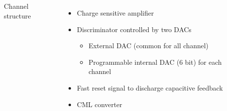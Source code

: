 \documentclass[aspectratio=169]{beamer}
\begin{document}
\begin{frame}
\begin{columns}
\begin{columns}
\begin{itemize}
			\end{itemize}
		\end{columns}
		{\color{blue} Channel structure }
		\begin{itemize}
			\item Charge sensitive amplifier
			\item Discriminator controlled by two DACs
			\begin{itemize}
				\item External DAC (common for all channel)
				\item Programmable internal DAC (6 bit) for each channel
			\end{itemize}
			\item Fast reset signal to discharge capacitive feedback
		\item CML converter  
		\end{itemize} 
	\end{columns}
	\end{frame}
\end{document}
